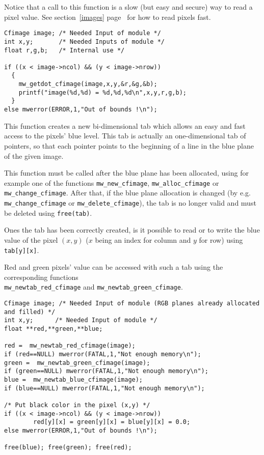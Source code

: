 Notice that a call to this function is a slow (but easy and secure) way to 
read a pixel value.
See section~\ref{images} page~\pageref{images} for how to read pixels fast.

\Next
\Example
\begin{verbatim}
Cfimage image; /* Needed Input of module */
int x,y;       /* Needed Inputs of module */
float r,g,b;   /* Internal use */

if ((x < image->ncol) && (y < image->nrow))
  {	
    mw_getdot_cfimage(image,x,y,&r,&g,&b);
    printf("image(%d,%d) = %d,%d,%d\n",x,y,r,g,b);
  }
else mwerror(ERROR,1,"Out of bounds !\n");

\end{verbatim}

\newpage %
\Description
This function creates a new bi-dimensional tab which allows an easy and fast
access to the pixels' blue level.
This tab is actually an one-dimensional tab of pointers, so that each pointer 
points to the beginning of a line in the blue plane of the given image.

This function must be called after the blue plane has been allocated,
using for example one of the functions \verb+mw_new_cfimage+, 
\verb+mw_alloc_cfimage+ or \verb+mw_change_cfimage+. 
After that, if the blue plane allocation is changed
(by e.g. \verb+mw_change_cfimage+ or \verb+mw_delete_cfimage+), the tab is
no longer valid and must be deleted using \verb+free(tab)+.

Ones the tab has been correctly created, is it possible to read or to
write the blue value of the pixel $(x,y)$ ($x$ being an index for column and $y$
for row) using \verb+tab[y][x]+.

Red and green pixels' value can be accessed with such a tab using 
the corresponding functions \\
\verb+mw_newtab_red_cfimage+ and \verb+mw_newtab_green_cfimage+.

\Next
\Example
\begin{verbatim}
Cfimage image; /* Needed Input of module (RGB planes already allocated and filled) */
int x,y;      /* Needed Input of module */
float **red,**green,**blue;

red =  mw_newtab_red_cfimage(image);
if (red==NULL) mwerror(FATAL,1,"Not enough memory\n");
green =  mw_newtab_green_cfimage(image);
if (green==NULL) mwerror(FATAL,1,"Not enough memory\n");
blue =  mw_newtab_blue_cfimage(image);
if (blue==NULL) mwerror(FATAL,1,"Not enough memory\n");

/* Put black color in the pixel (x,y) */
if ((x < image->ncol) && (y < image->nrow)) 
        red[y][x] = green[y][x] = blue[y][x] = 0.0;
else mwerror(ERROR,1,"Out of bounds !\n");

free(blue); free(green); free(red);
\end{verbatim}

